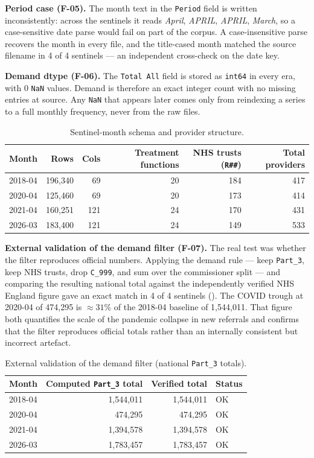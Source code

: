 \documentclass[11pt,a4paper]{article}
\begin{document}
\textbf{Period case (F-05).} The month text in the \texttt{Period} field is written inconsistently: across the sentinels it reads \emph{April}, \emph{APRIL}, \emph{APRIL}, \emph{March}, so a case-sensitive date parse would fail on part of the corpus. A case-insensitive parse recovers the month in every file, and the title-cased month matched the source filename in 4 of 4 sentinels --- an independent cross-check on the date key.

\textbf{Demand dtype (F-06).} The \texttt{Total All} field is stored as \texttt{int64} in every era, with 0 \texttt{NaN} values. Demand is therefore an exact integer count with no missing entries at source. Any \texttt{NaN} that appears later comes only from reindexing a series to a full monthly frequency, never from the raw files.

\begin{table}[H]
\centering
\caption{Sentinel-month schema and provider structure.}
\label{tab:sentinels}
\small
\begin{tabular}{l r r r r r}
\toprule
Month & Rows & Cols & Treatment functions & NHS trusts (\texttt{R\#\#}) & Total providers \\
\midrule
2018-04 & 196,340 & 69  & 20 & 184 & 417 \\
2020-04 & 125,460 & 69  & 20 & 173 & 414 \\
2021-04 & 160,251 & 121 & 24 & 170 & 431 \\
2026-03 & 183,400 & 121 & 24 & 149 & 533 \\
\bottomrule
\end{tabular}
\end{table}

\textbf{External validation of the demand filter (F-07).} The real test was whether the filter reproduces official numbers. Applying the demand rule --- keep \texttt{Part\_3}, keep NHS trusts, drop \texttt{C\_999}, and sum over the commissioner split --- and comparing the resulting national total against the independently verified NHS England figure gave an exact match in 4 of 4 sentinels (). The COVID trough at 2020-04 of 474,295 is $\approx 31\%$ of the 2018-04 baseline of 1,544,011. That figure both quantifies the scale of the pandemic collapse in new referrals and confirms that the filter reproduces official totals rather than an internally consistent but incorrect artefact.

\begin{table}[H]
\centering
\caption{External validation of the demand filter (national \texttt{Part\_3} totals).}
\label{tab:validation}
\begin{tabular}{l r r l}
\toprule
Month & Computed \texttt{Part\_3} total & Verified total & Status \\
\midrule
2018-04 & 1,544,011 & 1,544,011 & OK \\
2020-04 & 474,295   & 474,295   & OK \\
2021-04 & 1,394,578 & 1,394,578 & OK \\
2026-03 & 1,783,457 & 1,783,457 & OK \\
\bottomrule
\end{tabular}
\end{table}
\end{document}
